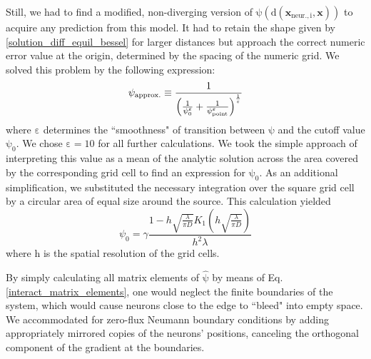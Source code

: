 \documentclass[10pt,letterpaper]{article}
\begin{document}
Still, we had to find a modified, non-diverging version of $\mathrm{\psi (d(\mathbf{x}_{\mathrm{neur.},i},\mathbf{x}))}$ to acquire any prediction from this model. It had to retain the shape given by \eqref{solution_diff_equil_bessel} for larger distances but approach the correct numeric error value at the origin, determined by the spacing of the numeric grid. We solved this problem by the following expression:
\begin{equation}
\psi_{\rm approx.} \equiv \frac{1}{\left(\frac{1}{\psi_0^\varepsilon} + \frac{1}{\psi_{\rm point}^\varepsilon}\right)^{\frac{1}{\varepsilon}}}
\label{Numeric_Solution_Expression_Trick}
\end{equation}
where $\mathrm{\varepsilon}$ determines the ``smoothness" of transition between $\mathrm{\psi}$ and the cutoff value $\mathrm{\psi_0}$. We chose $\mathrm{\varepsilon=10}$ for all further calculations. We took the simple approach of interpreting this value as a mean of the analytic solution across the area covered by the corresponding grid cell to find an expression for $\mathrm{\psi_0}$. As an additional simplification, we substituted the necessary integration over the square grid cell by a circular area of equal size around the source. This calculation yielded
\begin{equation}
\psi_0 = \gamma \frac{1-h\sqrt{\frac{\lambda}{\pi D}} K_1\left( h\sqrt{\frac{\lambda}{\pi D}}\right) }{h^2 \lambda}
\label{Numeric_Grid_Bessel_Approx}
\end{equation}
where $\mathrm{h}$ is the spatial resolution of the grid cells.

By simply calculating all matrix elements of $\mathrm{\hat{\psi}}$ by means of Eq. \eqref{interact_matrix_elements}, one would neglect the finite boundaries of the system, which would cause neurons close to the edge to ``bleed" into empty space. We accommodated for zero-flux Neumann boundary conditions by adding appropriately mirrored copies of the neurons' positions, canceling the orthogonal component of the gradient at the boundaries. 
\end{document}
